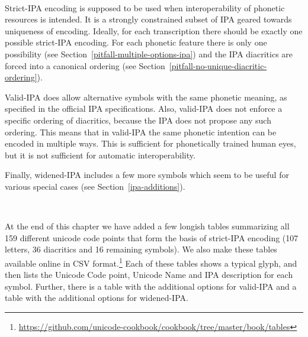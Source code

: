 \ 

\noindent Strict-IPA encoding is supposed to be used when interoperability of
phonetic resources is intended. It is a strongly constrained subset of IPA
geared towards uniqueness of encoding. Ideally, for each transcription there
should be exactly one possible strict-IPA encoding. For each phonetic feature
there is only one possibility (see Section~\ref{pitfall-multiple-options-ipa})
and the IPA diacritics are forced into a canonical ordering (see
Section~\ref{pitfall-no-unique-diacritic-ordering}).

Valid-IPA does allow alternative symbols with the same phonetic meaning, as 
specified in the official IPA specifications. Also, valid-IPA does not enforce a 
specific ordering of diacritics, because the IPA does not propose any such 
ordering. This means that in valid-IPA the same phonetic intention can be 
encoded in multiple ways. This is sufficient for phonetically trained human 
eyes, but it is not sufficient for automatic interoperability.

Finally, widened-IPA includes a few more symbols which seem to be useful for
various special cases (see Section~\ref{ipa-additions}).

\ 

\noindent At the end of this chapter we have added a few longish tables summarizing all
159 different unicode code points that form the basis of strict-IPA encoding
(107 letters, 36 diacritics and 16 remaining symbols). We also make these tables available 
online in CSV format.\footnote{\url{https://github.com/unicode-cookbook/cookbook/tree/master/book/tables}} 
Each of these tables shows a typical glyph, and then lists the Unicode Code point,
Unicode Name and IPA description for each symbol. Further, there is a table with 
the additional options for valid-IPA and a table with the additional options for 
widened-IPA.\@

